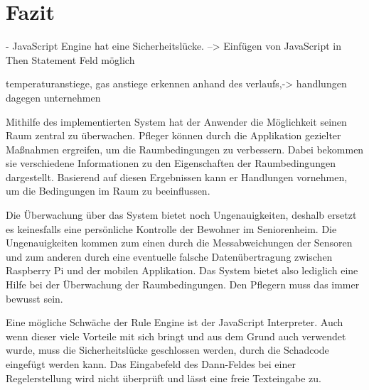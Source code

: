 \chapter{Fazit}

- JavaScript Engine hat eine Sicherheitslücke. --> Einfügen von JavaScript in Then Statement Feld möglich


temperaturanstiege, gas anstiege erkennen anhand des verlaufs,-> handlungen dagegen unternehmen


Mithilfe des implementierten System hat der Anwender die Möglichkeit seinen Raum zentral zu überwachen. Pfleger können durch die Applikation gezielter Maßnahmen ergreifen, um die Raumbedingungen zu verbessern. Dabei bekommen sie verschiedene Informationen zu den Eigenschaften der Raumbedingungen dargestellt. Basierend auf diesen Ergebnissen kann er Handlungen vornehmen, um die Bedingungen im Raum zu beeinflussen.
 
Die Überwachung über das System bietet noch Ungenauigkeiten, deshalb ersetzt es keinesfalls eine persönliche Kontrolle der Bewohner im Seniorenheim. Die Ungenauigkeiten kommen zum einen durch die Messabweichungen der Sensoren und zum anderen durch eine eventuelle falsche Datenübertragung zwischen Raspberry Pi und der mobilen Applikation. Das System bietet also lediglich eine Hilfe bei der Überwachung der Raumbedingungen. Den Pflegern muss das immer bewusst sein.

Eine mögliche Schwäche der Rule Engine ist der JavaScript Interpreter. Auch wenn dieser viele Vorteile mit sich bringt und aus dem Grund auch verwendet wurde, muss die Sicherheitslücke geschlossen werden, durch die Schadcode eingefügt werden kann. Das Eingabefeld des Dann-Feldes bei einer Regelerstellung wird nicht überprüft und lässt eine freie Texteingabe zu. 